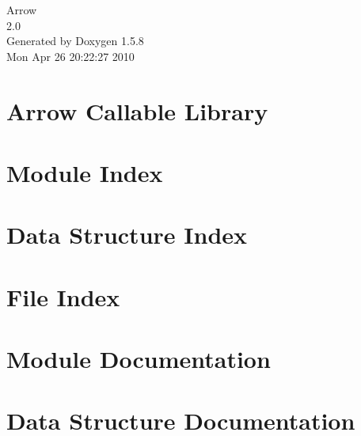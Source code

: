 \documentclass[a4paper]{book}
\begin{document}
\begin{titlepage}
\vspace*{7cm}
\begin{center}
{\Large Arrow \\[1ex]\large 2.0 }\\
\vspace*{1cm}
{\large Generated by Doxygen 1.5.8}\\
\vspace*{0.5cm}
{\small Mon Apr 26 20:22:27 2010}\\
\end{center}
\end{titlepage}
\clearemptydoublepage
{}
\tableofcontents
\clearemptydoublepage
{}
\chapter{Arrow Callable Library}
\label{index}\hypertarget{index}{}
\chapter{Module Index}

\chapter{Data Structure Index}

\chapter{File Index}

\chapter{Module Documentation}


\chapter{Data Structure Documentation}


























\end{document}
